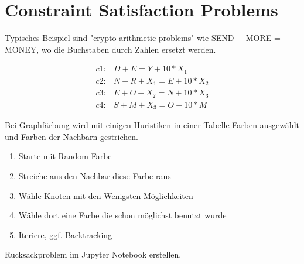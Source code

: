 \documentclass[a4paper]{article}
\title{\docTitle}
\author{Moritz}
\date{\today}
\begin{document}
\maketitle
\tableofcontents


\section{Constraint Satisfaction Problems}

Typisches Beispiel sind "crypto-arithmetic problems" wie SEND + MORE = MONEY, wo die Buchstaben durch Zahlen ersetzt werden.

\begin{align*}
    c1: & D+E=Y+10*X_1\\
    c2: & N+R+X_1 = E+10*X_2\\
    c3: & E+O+X_2 = N + 10*X_3\\
    c4: & S+M+X_3 = O + 10 * M
\end{align*}

Bei Graphfärbung wird mit einigen Huristiken in einer Tabelle Farben ausgewählt und Farben der Nachbarn gestrichen.

\begin{enumerate}
    \item Starte mit Random Farbe
    \item Streiche aus den Nachbar diese Farbe raus
    \item Wähle Knoten mit den Wenigsten Möglichkeiten
    \item Wähle dort eine Farbe die schon möglichst benutzt wurde
    \item Iteriere, ggf. Backtracking
\end{enumerate}


Rucksackproblem im Jupyter Notebook erstellen.
\end{document}
